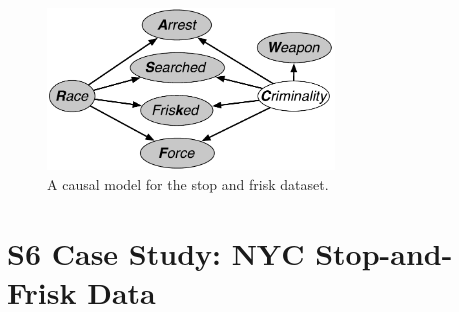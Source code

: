%

\begin{figure}[t]
\begin{center}
\centerline{\includegraphics[width=3in]{stop_and_frisk_model6.pdf}}
\caption{A causal model for the stop and frisk dataset.\label{figure.stop_and_frisk6}}
\end{center}
\end{figure}

\section*{S6 Case Study: NYC Stop-and-Frisk Data}
\label{sec:true-vs.-perceived}

